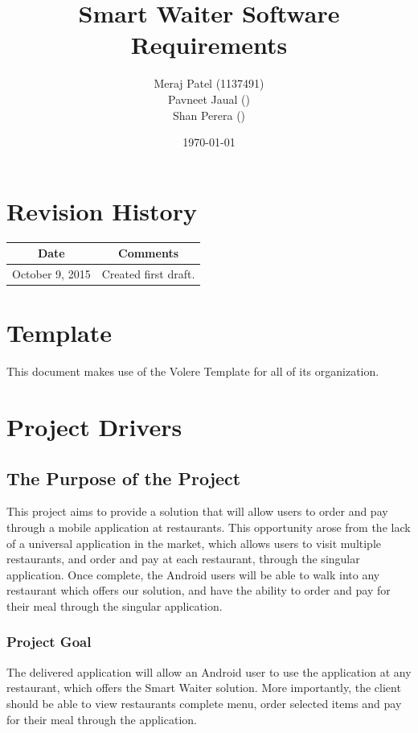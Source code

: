 \documentclass[12pt, titlepage]{article}
\begin{document}
\title{Smart Waiter Software Requirements} 
\author{Meraj Patel (1137491)\\ Pavneet Jaual ()\\ Shan Perera ()}
\date{\today}
\maketitle

\tableofcontents 
\listoffigures
\listoftables

\section*{Revision History}
\begin{tabular}{|c|c|}
\hline
\textbf{Date}  & \textbf{Comments} \\ \hline
October 9, 2015 & Created first draft. \\ 
\hline
\end{tabular}

\section*{Template}
This document makes use of the Volere Template for all of its organization.


\section{Project Drivers}

\subsection{The Purpose of the Project}
This project aims to provide a solution that will allow users to order and pay through a mobile application at restaurants. This opportunity arose from the lack of a universal application in the market, which allows users to visit multiple restaurants, and order and pay at each restaurant, through the singular application. Once complete, the Android users will be able to walk into any restaurant which offers our solution, and have the ability to order and pay for their meal through the singular application.
\subsubsection{Project Goal}
The delivered application will allow an Android user to use the application at any restaurant, which offers the Smart Waiter solution.  More importantly, the client should be able to view restaurants complete menu, order selected items and pay for their meal through the application. 
\end{document}
